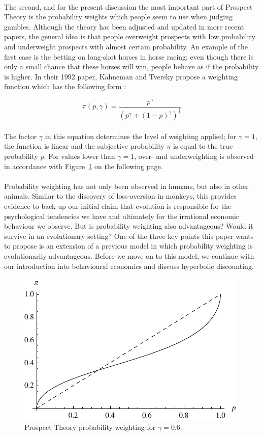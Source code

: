\documentclass[a4paper,10pt]{article}
\numberwithin{equation}{section}
\begin{document}
\\
The second, and for the present discussion the most important part of Prospect Theory is the probability weights which people seem to use when judging gambles. Although the theory has been adjusted and updated in more recent papers, the general idea is that people overweight prospects with low probability and underweight prospects with almost certain probability. An example of the first case is the betting on long-shot horses in horse racing; even though there is only a small chance that these horses will win, people behave as if the probability is higher. In their 1992 paper, Kahneman and Tversky propose a weighting function which has the following form \cite{Tversky1992}:

\begin{equation}
\label{eq:myWeight}
\pi(p, \gamma)=\frac{p^{\gamma}}{(p^{\gamma}+(1-p)^{\gamma})^{\frac{1}{\gamma}}}
\end{equation}\\

The factor $\gamma$ in this equation determines the level of weighting applied; for $\gamma=1$, the function is linear and the subjective probability $\pi$ is equal to the true probability $p$. For values lower than $\gamma=1$, over- and underweighting is observed in accordance with Figure~\ref{fig:Graph1.pdf} on the following page.\\
\\
Probability weighting has not only been observed in humans, but also in other animals. Similar to the discovery of loss-aversion in monkeys, this provides evidence to back up our initial claim that evolution is responsible for the psychological tendencies we have and ultimately for the irrational economic behaviour we observe. But is probability weighting also advantageous? Would it survive in an evolutionary setting? One of the three key points this paper wants to propose is an extension of a previous model in which probability weighting is evolutionarily advantageous. Before we move on to this model, we continue with our introduction into behavioural economics and discuss hyperbolic discounting.

\begin{figure}[h]
\begin{center}
\leavevmode
\includegraphics[scale=1.2]{Graph1.pdf}
\caption{Prospect Theory probability weighting for $\gamma=0.6$.}
\label{fig:Graph1.pdf}
\end{center}
\end{figure}
\end{document}
